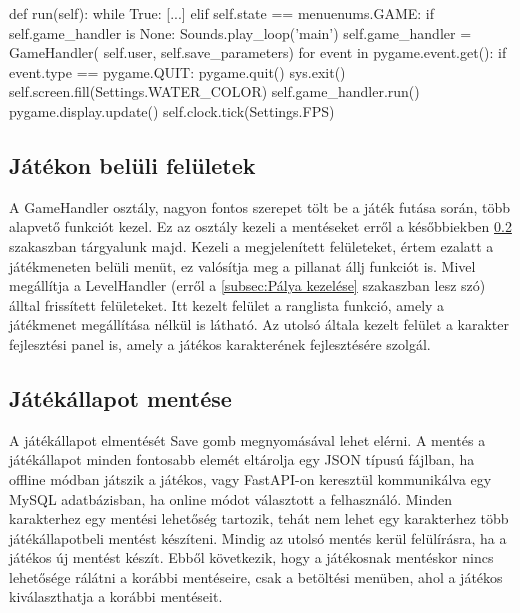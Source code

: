 \begin{python}[caption={Játék főciklusa},label=py:főciklus]
    def run(self):
        while True:
            [...]
            elif self.state == menuenums.GAME:
                if self.game_handler is None:
                    Sounds.play_loop('main')
                    self.game_handler = GameHandler(
                        self.user, self.save_parameters)
                for event in pygame.event.get():
                    if event.type == pygame.QUIT:
                        pygame.quit()
                        sys.exit()
                self.screen.fill(Settings.WATER_COLOR)
                self.game_handler.run()
                pygame.display.update()
                self.clock.tick(Settings.FPS)
\end{python}

\subsection{Játékon belüli felületek} \label{subsec:A játék fő osztálya}
 A GameHandler osztály, nagyon fontos szerepet tölt be a játék futása során, több alapvető funkciót kezel. Ez az osztály kezeli a mentéseket erről a későbbiekben \ref{subsec:Játékállapot mentése} szakaszban tárgyalunk majd. 
Kezeli a megjelenített felületeket, értem ezalatt a játékmeneten belüli menüt, ez valósítja meg a pillanat állj funkciót is. Mivel megállítja a LevelHandler (erről a \ref{subsec:Pálya kezelése} szakaszban lesz szó) álltal frissített felületeket. Itt kezelt felület a ranglista funkció, amely a játékmenet megállítása nélkül is látható. Az utolsó általa kezelt felület a karakter fejlesztési panel is, amely a játékos karakterének fejlesztésére szolgál.

\subsection{Játékállapot mentése} \label{subsec:Játékállapot mentése}
 A játékállapot elmentését Save gomb megnyomásával lehet elérni. A mentés a játékállapot minden fontosabb elemét eltárolja egy JSON típusú fájlban, ha offline módban játszik a játékos, vagy FastAPI-on \cite{fastapi} keresztül kommunikálva egy MySQL \cite{mysql} adatbázisban, ha online módot választott a felhasználó. 
Minden karakterhez egy mentési lehetőség tartozik, tehát nem lehet egy karakterhez több játékállapotbeli mentést készíteni. Mindig az utolsó mentés kerül felülírásra, ha a játékos új mentést készít. Ebből következik, hogy a játékosnak mentéskor nincs lehetősége rálátni a korábbi mentéseire, csak a betöltési menüben, ahol a játékos kiválaszthatja a korábbi mentéseit.

